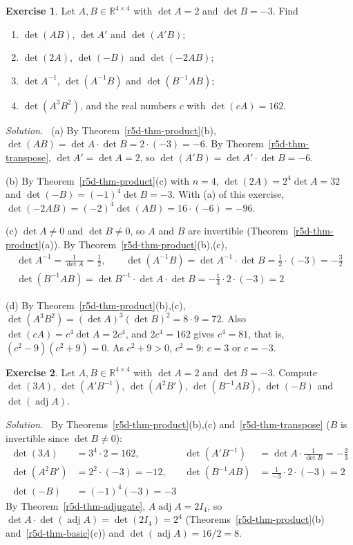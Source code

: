 \documentclass[12pt]{article}
\newcommand{\R}{\mathbb R}
\theoremstyle{definition}
\newtheorem{exercise}{Exercise}
\newenvironment{solution}{\par\noindent\textit{Solution.}\ }{\par\smallskip}
\begin{document}
\begin{exercise}\label{r5d-dr-det-rules}
Let \(A,B\in\R^{4\times4}\) with \(\det A=2\) and \(\det B=-3\). Find
\begin{enumerate}
\item \(\det(AB)\), \(\det A'\) and \(\det(A'B)\);
\item \(\det(2A)\), \(\det(-B)\) and \(\det(-2AB)\);
\item \(\det A^{-1}\), \(\det(A^{-1}B)\) and \(\det(B^{-1}AB)\);
\item \(\det(A^3B^2)\), and the real numbers \(c\) with \(\det(cA)=162\).
\end{enumerate}
\end{exercise}
\begin{solution}
(a) By Theorem~\ref{r5d-thm-product}(b), \(\det(AB)=\det A\cdot\det B=2\cdot(-3)=-6\). By
Theorem~\ref{r5d-thm-transpose}, \(\det A'=\det A=2\), so \(\det(A'B)=\det A'\cdot\det B=-6\).

(b) By Theorem~\ref{r5d-thm-product}(c) with \(n=4\), \(\det(2A)=2^4\det A=32\) and
\(\det(-B)=(-1)^4\det B=-3\). With (a) of this exercise, \(\det(-2AB)=(-2)^4\det(AB)=16\cdot(-6)=-96\).

(c) \(\det A\ne0\) and \(\det B\ne0\), so \(A\) and \(B\) are invertible (Theorem~\ref{r5d-thm-product}(a)). By
Theorem~\ref{r5d-thm-product}(b),(c),
\[
\begin{gathered}
\det A^{-1}=\frac1{\det A}=\frac12,\qquad\det(A^{-1}B)=\det A^{-1}\cdot\det B=\frac12\cdot(-3)=-\frac32\\
\det(B^{-1}AB)=\det B^{-1}\cdot\det A\cdot\det B=-\frac13\cdot2\cdot(-3)=2
\end{gathered}
\]

(d) By Theorem~\ref{r5d-thm-product}(b),(c), \(\det(A^3B^2)=(\det A)^3(\det B)^2=8\cdot9=72\). Also
\(\det(cA)=c^4\det A=2c^4\), and \(2c^4=162\) gives \(c^4=81\), that is, \((c^2-9)(c^2+9)=0\). As \(c^2+9>0\),
\(c^2=9\): \(c=3\) or \(c=-3\).
\end{solution}

\begin{exercise}\label{r5d-ex-det-rules}
Let \(A,B\in\R^{4\times4}\) with \(\det A=2\) and \(\det B=-3\). Compute \(\det(3A)\),
\(\det(A'B^{-1})\), \(\det(A^2B')\), \(\det(B^{-1}AB)\), \(\det(-B)\) and \(\det(\operatorname{adj}A)\).
\end{exercise}
\begin{solution}
By Theorems~\ref{r5d-thm-product}(b),(c) and~\ref{r5d-thm-transpose} (\(B\) is invertible since
\(\det B\ne0\)):
\[
\begin{aligned}
\det(3A)&=3^4\cdot2=162,&\det(A'B^{-1})&=\det A\cdot\frac1{\det B}=-\frac23\\
\det(A^2B')&=2^2\cdot(-3)=-12,&\det(B^{-1}AB)&=\frac1{-3}\cdot2\cdot(-3)=2\\
\det(-B)&=(-1)^4(-3)=-3
\end{aligned}
\]
By Theorem~\ref{r5d-thm-adjugate}, \(A\operatorname{adj}A=2I_4\), so
\(\det A\cdot\det(\operatorname{adj}A)=\det(2I_4)=2^4\) (Theorems~\ref{r5d-thm-product}(b)
and~\ref{r5d-thm-basic}(c)) and \(\det(\operatorname{adj}A)=16/2=8\).
\end{solution}
\end{document}
